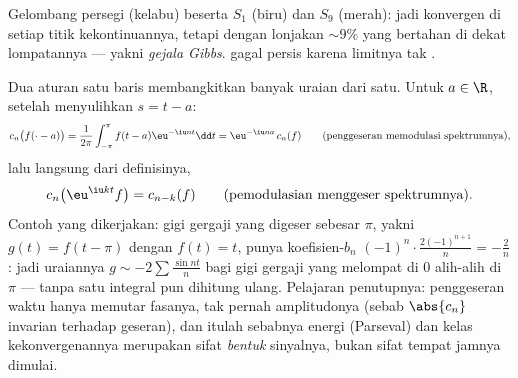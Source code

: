 \begin{omfigure}

{\small Gelombang persegi (kelabu) beserta  $S_1$
(biru) dan $S_9$ (merah): jadi konvergen di setiap titik kekontinuannya, tetapi
dengan lonjakan $\sim 9\%$ yang bertahan di dekat lompatannya --- yakni
\emph{gejala Gibbs}. 
gagal persis karena limitnya tak .}
\end{omfigure}

\begin{example}\label{ex:b2:fourier:shiftrules}
Dua aturan satu baris membangkitkan banyak uraian dari satu. Untuk $a
\in \R$, setelah menyulihkan $s = t - a$:
\[
c_n\bigl(f(\cdot - a)\bigr)
= \frac{1}{2\pi}\int_{-\pi}^{\pi}f(t - a)\eu^{-\iu nt}\dd t
= \eu^{-\iu na}\,c_n(f)
\qquad\text{(penggeseran memodulasi spektrumnya)},
\]
lalu langsung dari definisinya,
\[
c_n\bigl(\eu^{\iu kt}f\bigr) = c_{n-k}(f)
\qquad\text{(pemodulasian menggeser spektrumnya)}.
\]
Contoh yang dikerjakan: gigi gergaji yang digeser sebesar $\pi$, yakni $g(t) = f(t -
\pi)$ dengan $f(t) = t$, punya koefisien-$b_n$
$(-1)^n\cdot\frac{2(-1)^{n+1}}{n} = -\frac2n$: jadi uraiannya
$g \sim -2\sum\frac{\sin nt}{n}$ bagi gigi gergaji yang melompat di
$0$ alih-alih di $\pi$ --- tanpa satu integral pun dihitung ulang. Pelajaran
penutupnya: penggeseran waktu hanya memutar fasanya, tak pernah amplitudonya
(sebab $\abs{c_n}$ invarian terhadap geseran), dan itulah sebabnya energi
(Parseval) dan kelas kekonvergenannya merupakan sifat \emph{bentuk}
sinyalnya, bukan sifat tempat jamnya dimulai.
\end{example}

